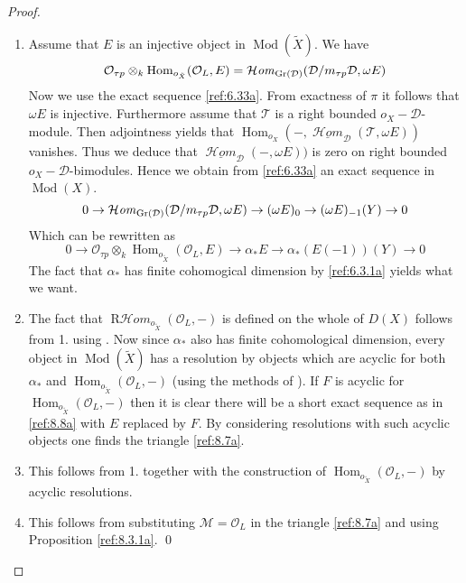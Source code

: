 \documentclass{amsproc}
\def\Dscr{{\mathcal D}}
\def\Hscr{{\mathcal H}}
\def\Mscr{{\mathcal M}}
\def\Oscr{{\mathcal O}}
\def\Tscr{{\mathcal T}}
\def\HHom{\operatorname {\Hscr \mathit{om}}}
\def\RHHom{\operatorname {R\Hscr \mathit{om}}}
\def\Gr{\mathop{\text{Gr}}}
\def\Hom{\operatorname {Hom}}
\def\HHom{\operatorname {\Hscr \mathit{om}}}
\def\Qch{\operatorname {Mod}}
\def\r{\rightarrow}
\let\oldtext\text
\def\text#1{\oldtext{\upshape #1}}
\theoremstyle{definition}
\theoremstyle{remark}
\numberwithin{equation}{section}
\numberwithin{table}{section}
\numberwithin{figure}{section}
\def\Gr{\mathop{\text{Gr}}}
\begin{document}
\begin{proof}
\begin{enumerate}
\item
Assume that $E$ is an injective object in $\Qch(\tilde{X})$. We have
\[
\Oscr_{\tau p}\otimes_k  \Hom_{o_{\tilde{X}}}(\Oscr_L,E)=
\HHom_{\Gr(\Dscr)} (\Dscr/m_{\tau
    p}\Dscr,\omega E)
\]
Now we use the exact sequence \eqref{ref:6.33a}. From exactness of $\pi$
it follows that $\omega E$ is injective. Furthermore assume that
$\Tscr$ is a right bounded $o_X-\Dscr$-module. Then adjointness yields
that $\Hom_{o_X}(-,\underline{\HHom}_{\Dscr}(\Tscr,\omega E))$
vanishes. Thus we deduce that $\underline{\HHom}_{\Dscr}(-,\omega E))$
is zero on right bounded $o_X-\Dscr$-bimodules. Hence we obtain from
\eqref{ref:6.33a} an exact sequence in $\Qch(X)$.
\[
0\r \HHom_{\Gr(\Dscr)}(\Dscr/m_{\tau
    p}\Dscr,\omega E)\r 
(\omega E)_0\r
(\omega E)_{-1}(Y)\r 
0
\]
Which can be rewritten as
\begin{equation}
\label{ref:8.8a}
0\r 
\Oscr_{\tau p}\otimes_k  \Hom_{o_{\tilde{X}}}(\Oscr_L,E)
\r 
\alpha_\ast E\r
\alpha_\ast (E(-1))(Y)\r 
0
\end{equation}
The fact that $\alpha_\ast$ has finite cohomogical dimension by
\ref{ref:6.3.1a} yields what we want.

\item The fact that $\RHHom_{o_{\tilde{X}}}(\Oscr_L,-)$ is defined on the
  whole of $D(X)$ follows from 1.  using \cite{RD}.  Now since $\alpha_\ast$
  also has finite cohomological dimension, every object in
  $\Qch(\tilde{X})$ has a resolution by objects which are acyclic for
  both $\alpha_\ast$  and $\Hom_{o_{\tilde{X}}}(\Oscr_L,-)$ (using the
  methods of \cite{RD}).
If $F$ is acyclic for
  $\Hom_{o_{\tilde{X}}}(\Oscr_L,-)$ then it is clear there will be a short
  exact sequence as in \eqref{ref:8.8a} with $E$ replaced by $F$. By
  considering resolutions with such acyclic objects one finds the
  triangle \eqref{ref:8.7a}.
\item This follows from 1. together with the construction of  
$\Hom_{o_{\tilde{X}}}(\Oscr_L,-)$ by acyclic resolutions. 
 \item This follows from substituting $\Mscr=\Oscr_L$ in the triangle
 \eqref{ref:8.7a} and using Proposition \ref{ref:8.3.1a}.
  \qed \end{enumerate}
\def\qed{}


\end{proof}
\end{document}

